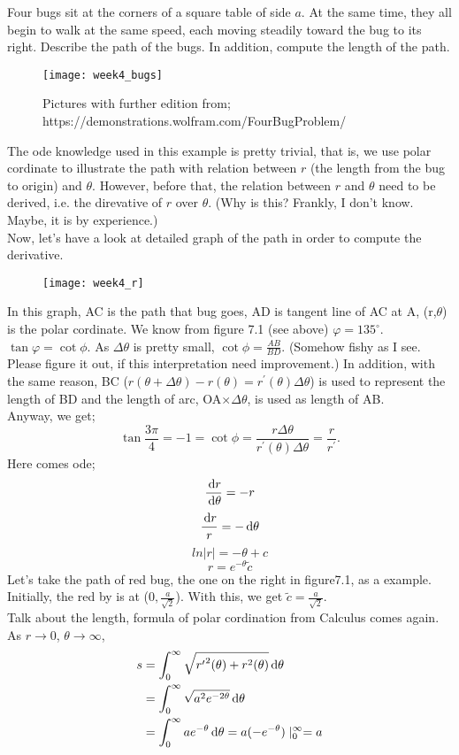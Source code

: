 \begin{example}
Four bugs sit at the corners of a square table of side $a$. At the same time, they all begin to walk at the same speed, each moving steadily toward the bug to its right. Describe the path of the bugs. In addition, compute the length of the path.
\begin{figure}[H]
\centering
\texttt{[image: week4\_bugs]}
\caption{Pictures with further edition from; https://demonstrations.wolfram.com/FourBugProblem/}
\end{figure}
The ode knowledge used in this example is pretty trivial, that is, we use polar cordinate to illustrate the path with relation between $r$ (the length from the bug to origin) and $\theta$. However, before that, the relation between $r$ and $\theta$ need to be derived, i.e. the direvative of $r$ over $\theta$. (Why is this? Frankly, I don't know. Maybe, it is by experience.)\\
Now, let's have a look at detailed graph of the path in order to compute the derivative.
\begin{figure}[H]
\centering
\texttt{[image: week4\_r]}
\end{figure}
In this graph, AC is the path that bug goes, AD is tangent line of AC at A, (r,$\theta$) is the polar cordinate. We know from figure 7.1 (see above) $\varphi=135^\circ$. $\tan\varphi=\cot\phi$. As $\Delta\theta$ is pretty small, $\cot\phi=\frac{AB}{BD}$. (Somehow fishy as I see. Please figure it out, if this interpretation need improvement.) In addition, with the same reason, BC ($r(\theta+\Delta\theta)-r(\theta)=r^\prime(\theta)\Delta\theta$) is used to represent the length of BD and the length of arc, OA$\times\Delta\theta$, is used as length of AB.\\
Anyway, we get;
\[\tan\frac{3\pi}{4}=-1=\cot\phi=\frac{r\Delta\theta}{r^\prime(\theta)\Delta\theta}=\frac{r}{r^\prime}.
\]
Here comes ode;
\[\frac{\,\mathrm{d} r}{\,\mathrm{d} \theta}=-r
\]
\[\frac{\,\mathrm{d} r}{r}=-\,\mathrm{d} \theta
\]
\[ln|r|=-\theta+c
\]
\[r=e^{-\theta}\tilde{c}
\]
Let's take the path of red bug, the one on the right in figure7.1, as a example.\\
Initially, the red by is at ($0,\frac{a}{\sqrt{2}}$). With this, we get $\tilde{c}=\frac{a}{\sqrt{2}}$.\\
Talk about the length, formula of polar cordination from Calculus comes again.\\
As $r\rightarrow0$, $\theta\rightarrow\infty$,
\[\begin{aligned}
s&=\int_0^\infty\sqrt{{r^\prime}^2(\theta)+r^2(\theta)}\,\mathrm{d}\theta\\
&=\int_0^\infty\sqrt{a^2e^{-2\theta}}\,\mathrm{d}\theta\\
&=\int_0^\infty ae^{-\theta}\,\mathrm{d}\theta=a(-e^{-\theta})\mid^\infty_0=a
\end{aligned}
\] 
\end{example}



